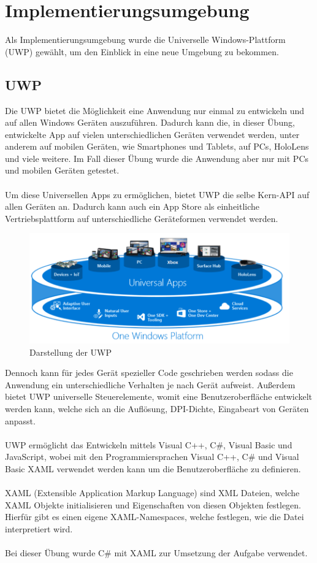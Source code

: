 
\section{Implementierungsumgebung}

Als Implementierungsumgebung wurde die Universelle Windows-Plattform (UWP) gewählt, um den Einblick in eine neue Umgebung zu bekommen.

\subsection{UWP}

Die UWP bietet die Möglichkeit eine Anwendung nur einmal zu entwickeln und auf allen Windows Geräten auszuführen. Dadurch kann die, in dieser Übung, entwickelte App auf vielen unterschiedlichen Geräten verwendet werden, unter anderem auf mobilen Geräten, wie Smartphones und Tablets, auf PCs, HoloLens und viele weitere. Im Fall dieser Übung wurde die Anwendung aber nur mit PCs und mobilen Geräten getestet.
\\\\
Um diese Universellen Apps zu ermöglichen, bietet UWP die selbe Kern-API auf allen Geräten an. Dadurch kann auch ein App Store als einheitliche Vertriebsplattform auf unterschiedliche Geräteformen verwendet werden.

\begin{figure}[H]
	\centering
	\includegraphics[width=0.7\linewidth]{images/screenshot001}
	\caption{Darstellung der UWP}
	\label{fig:screenshot001}
\end{figure}

Dennoch kann für jedes Gerät spezieller Code geschrieben werden sodass die Anwendung ein unterschiedliche Verhalten je nach Gerät aufweist. Außerdem bietet UWP universelle Steuerelemente, womit eine Benutzeroberfläche entwickelt werden kann, welche sich an die Auflösung, DPI-Dichte, Eingabeart von Geräten anpasst.
\\\\
UWP ermöglicht das Entwickeln mittels Visual C++, C\#, Visual Basic und JavaScript, wobei mit den Programmiersprachen Visual C++, C\# und Visual Basic XAML verwendet werden kann um die Benutzeroberfläche zu definieren. \cite{UWPAllgemein}
\\\\
XAML (Extensible Application Markup Language) sind XML Dateien, welche XAML Objekte initialisieren und Eigenschaften von diesen Objekten festlegen. Hierfür gibt es einen eigene XAML-Namespaces, welche festlegen, wie die Datei interpretiert wird. \cite{xamlOverview}
\\\\
Bei dieser Übung wurde C\# mit XAML zur Umsetzung der Aufgabe verwendet.

